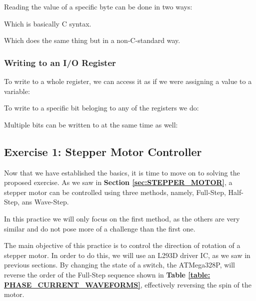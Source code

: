 Reading the value of a specific byte can be done in two ways:


Which is basically C syntax.


Which does the same thing but in a non-C-standard way.

\clearpage

\subsubsection{Writing to an I/O Register}

To write to a whole register, we can access it as if we were assigning a value to a variable:


To write to a specific bit beloging to any of the registers we do:


Multiple bits can be written to at the same time as well:


\clearpage

\subsection{Exercise 1: Stepper Motor Controller}

Now that we have established the basics, it is time to move on to solving the proposed exercise. As we saw in \textbf{Section \ref{sec:STEPPER_MOTOR}}, a stepper motor can be controlled using three methods, namely, Full-Step, Half-Step, ans Wave-Step. 

In this practice we will only focus on the first method, as the others are very similar and do not pose more of a challenge than the first one.\medskip

The main objective of this practice is to control the direction of rotation of a stepper motor. In order to do this, we will use an L293D driver IC, as we saw in previous sections. By changing the state of a switch, the ATMega328P, will reverse the order of the Full-Step sequence shown in \textbf{Table \ref{table: PHASE_CURRENT_WAVEFORMS}}, effectively reversing the spin of the motor.\medskip

